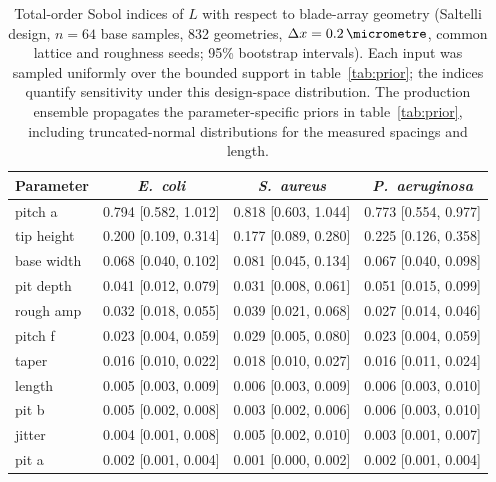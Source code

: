 \begin{table}[h]\centering\small
\caption{Total-order Sobol indices of $L$ with respect to blade-array geometry (Saltelli design, $n=64$ base samples, 832 geometries, $\Delta x=\SI{0.2}{\micrometre}$, common lattice and roughness seeds; 95\% bootstrap intervals). Each input was sampled uniformly over the bounded support in table~\ref{tab:prior}; the indices quantify sensitivity under this design-space distribution. The production ensemble propagates the parameter-specific priors in table~\ref{tab:prior}, including truncated-normal distributions for the measured spacings and length.}\label{tab:sobolgeom}
\begin{tabular}{lccc}\toprule Parameter & \textit{E.~coli} & \textit{S.~aureus} & \textit{P.~aeruginosa}\\\midrule
pitch a & 0.794 [0.582, 1.012] & 0.818 [0.603, 1.044] & 0.773 [0.554, 0.977]\\
tip height & 0.200 [0.109, 0.314] & 0.177 [0.089, 0.280] & 0.225 [0.126, 0.358]\\
base width & 0.068 [0.040, 0.102] & 0.081 [0.045, 0.134] & 0.067 [0.040, 0.098]\\
pit depth & 0.041 [0.012, 0.079] & 0.031 [0.008, 0.061] & 0.051 [0.015, 0.099]\\
rough amp & 0.032 [0.018, 0.055] & 0.039 [0.021, 0.068] & 0.027 [0.014, 0.046]\\
pitch f & 0.023 [0.004, 0.059] & 0.029 [0.005, 0.080] & 0.023 [0.004, 0.059]\\
taper & 0.016 [0.010, 0.022] & 0.018 [0.010, 0.027] & 0.016 [0.011, 0.024]\\
length & 0.005 [0.003, 0.009] & 0.006 [0.003, 0.009] & 0.006 [0.003, 0.010]\\
pit b & 0.005 [0.002, 0.008] & 0.003 [0.002, 0.006] & 0.006 [0.003, 0.010]\\
jitter & 0.004 [0.001, 0.008] & 0.005 [0.002, 0.010] & 0.003 [0.001, 0.007]\\
pit a & 0.002 [0.001, 0.004] & 0.001 [0.000, 0.002] & 0.002 [0.001, 0.004]\\
\bottomrule\end{tabular}\end{table}
